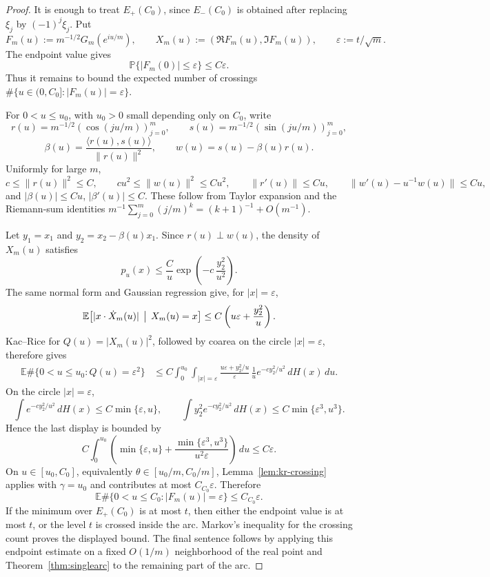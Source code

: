 \documentclass[11pt]{amsart}
\numberwithin{equation}{section}
\theoremstyle{definition}
\theoremstyle{remark}
\newcommand{\Prob}{\mathbb P}
\newcommand{\Exp}{\mathbb E}
\newcommand{\eps}{\varepsilon}
\begin{document}
\begin{proof}
It is enough to treat \(E_+(C_0)\), since \(E_-(C_0)\) is obtained after
replacing \(\xi_j\) by \((-1)^j\xi_j\).  Put
\[
  F_m(u):=m^{-1/2}G_m(e^{iu/m}),\qquad
  X_m(u):=(\Re F_m(u),\Im F_m(u)),\qquad
  \eps:=t/\sqrt m .
\]
The endpoint value gives
\[
  \Prob\{|F_m(0)|\le\eps\}\le C\eps .
\]
Thus it remains to bound the expected number of crossings
\(\#\{u\in(0,C_0]: |F_m(u)|=\eps\}\).

For \(0<u\le u_0\), with \(u_0>0\) small depending only on \(C_0\), write
\[
  r(u)=m^{-1/2}(\cos(ju/m))_{j=0}^m,\qquad
  s(u)=m^{-1/2}(\sin(ju/m))_{j=0}^m,
\]
\[
  \beta(u)=\frac{\langle r(u),s(u)\rangle}{\|r(u)\|^2},
  \qquad w(u)=s(u)-\beta(u)r(u).
\]
Uniformly for large \(m\),
\[
  c\le\|r(u)\|^2\le C,\qquad
  cu^2\le\|w(u)\|^2\le Cu^2,\qquad
  \|r'(u)\|\le Cu,\qquad
  \|w'(u)-u^{-1}w(u)\|\le Cu,
\]
and \(|\beta(u)|\le Cu\), \(|\beta'(u)|\le C\).  These follow from Taylor
expansion and the Riemann-sum identities
\(m^{-1}\sum_{j=0}^m(j/m)^k=(k+1)^{-1}+O(m^{-1})\).

Let \(y_1=x_1\) and \(y_2=x_2-\beta(u)x_1\).  Since \(r(u)\perp w(u)\), the
density of \(X_m(u)\) satisfies
\[
  p_u(x)\le \frac{C}{u}\exp\!\left(-c\,\frac{y_2^2}{u^2}\right).
\]
The same normal form and Gaussian regression give, for \(|x|=\eps\),
\[
  \Exp\bigl[|x\cdot \dot X_m(u)|\,\bigm|\,X_m(u)=x\bigr]
  \le C\left(u\eps+\frac{y_2^2}{u}\right).
\]
Kac--Rice for \(Q(u)=|X_m(u)|^2\), followed by coarea on the circle
\(|x|=\eps\), therefore gives
\[
\begin{aligned}
  \Exp \#\{0<u\le u_0:Q(u)=\eps^2\}
  &\le C\int_0^{u_0}\int_{|x|=\eps}
     \frac{u\eps+y_2^2/u}{\eps}\,
     \frac1u e^{-c y_2^2/u^2}\,dH(x)\,du .
\end{aligned}
\]
On the circle \(|x|=\eps\),
\[
  \int e^{-c y_2^2/u^2}\,dH(x)\le C\min\{\eps,u\},\qquad
  \int y_2^2 e^{-c y_2^2/u^2}\,dH(x)\le C\min\{\eps^3,u^3\}.
\]
Hence the last display is bounded by
\[
  C\int_0^{u_0}\left(\min\{\eps,u\}
    +\frac{\min\{\eps^3,u^3\}}{u^2\eps}\right)\,du
  \le C\eps .
\]
On \(u\in[u_0,C_0]\), equivalently
\(\theta\in[u_0/m,C_0/m]\), Lemma~\ref{lem:kr-crossing} applies with
\(\gamma=u_0\) and contributes at most \(C_{C_0}\eps\).  Therefore
\[
  \Exp \#\{0<u\le C_0: |F_m(u)|=\eps\}\le C_{C_0}\eps .
\]
If the minimum over \(E_+(C_0)\) is at most \(t\), then either the endpoint
value is at most \(t\), or the level \(t\) is crossed inside the arc.  Markov's
inequality for the crossing count proves the displayed bound.  The final
sentence follows by applying this endpoint estimate on a fixed \(O(1/m)\)
neighborhood of the real point and Theorem~\ref{thm:singlearc} to the remaining
part of the arc.
\end{proof}
\end{document}
